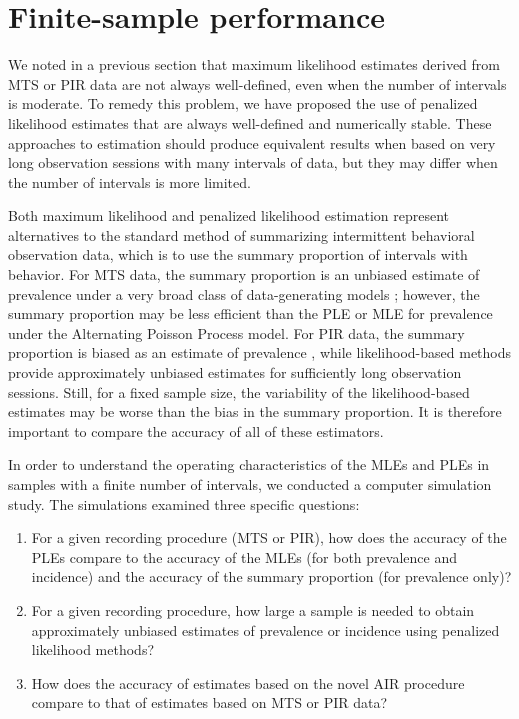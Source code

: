 \documentclass[man, noextraspace, floatsintext]{apa6}\usepackage[]{graphicx}\usepackage[]{color}
\begin{document}
\section{Finite-sample performance}

We noted in a previous section that maximum likelihood estimates derived from MTS or PIR data are not always well-defined, even when the number of intervals is moderate. 
To remedy this problem, we have proposed the use of penalized likelihood estimates that are always well-defined and numerically stable. 
These approaches to estimation should produce equivalent results when based on very long observation sessions with many intervals of data, but they may differ when the number of intervals is more limited. 

Both maximum likelihood and penalized likelihood estimation represent alternatives to the standard method of summarizing intermittent behavioral observation data, which is to use the summary proportion of intervals with behavior. 
For MTS data, the summary proportion is an unbiased estimate of prevalence under a very broad class of data-generating models \citep{Rogosa1991statistical}; however, the summary proportion may be less efficient than the PLE or MLE for prevalence under the Alternating Poisson Process model. 
For PIR data, the summary proportion is biased as an estimate of prevalence \citep{Rogosa1991statistical}, while likelihood-based methods provide approximately unbiased estimates for sufficiently long observation sessions. 
Still, for a fixed sample size, the variability of the likelihood-based estimates may be worse than the bias in the summary proportion. It is therefore important to compare the accuracy of all of these estimators.

In order to understand the operating characteristics of the MLEs and PLEs in samples with a finite number of intervals, we conducted a computer simulation study. The simulations examined three specific questions: 
\begin{enumerate}
\item For a given recording procedure (MTS or PIR), how does the accuracy of the PLEs compare to the accuracy of the MLEs (for both prevalence and incidence) and the accuracy of the summary proportion (for prevalence only)? 
\item For a given recording procedure, how large a sample is needed to obtain approximately unbiased estimates of prevalence or incidence using penalized likelihood methods? 
\item How does the accuracy of estimates based on the novel AIR procedure compare to that of estimates based on MTS or PIR data? 
\end{enumerate}
\end{document}

